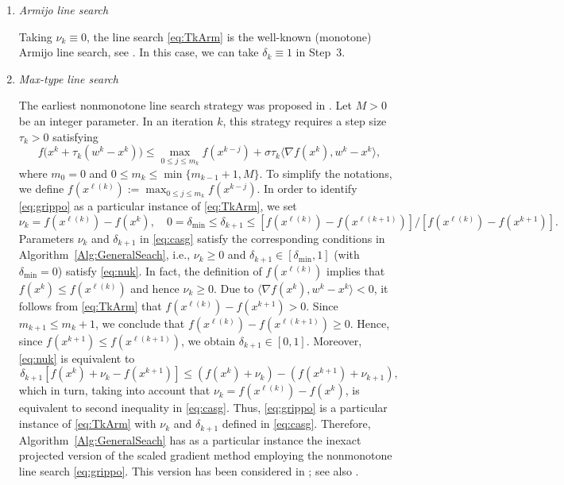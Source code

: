 \begin{enumerate}
	\item {\it Armijo line search}

	      Taking  $\nu_k\equiv 0$, the line search   \eqref{eq:TkArm}  is the well-known (monotone) Armijo line search, see \cite[Section 2.3]{Bertsekas1999}. In this case, we  can take  $\delta_k\equiv 1$ in Step~3.

	\item {\it Max-type line search}

	      The earliest nonmonotone line search strategy  was proposed  in \cite{Grippo1986}. Let $M>0$ be an integer parameter. In an iteration $k$, this strategy requires a step size $\tau_k>0$ satisfying
	      \begin{equation}\label{eq:grippo}
		      f\big(x^{k}+ \tau_k(w^k - x^{k})\big) \leq \max_{0\leq j\leq m_k}f(x^{k-j}) + \sigma \tau_k\big\langle \nabla f(x^{k}), w^k - x^{k} \big\rangle,
	      \end{equation}
	      where $m_0=0$ and $0\leq m_k\leq \min\{m_{k-1}+1, M\}$.  To simplify the notations,  we define $f(x^{\ell(k)}):=\max_{0\leq j\leq m_k}f(x^{k-j})$.  In order to identify \eqref{eq:grippo} as a particular instance of \eqref{eq:TkArm}, we  set
	      \begin{equation} \label{eq:casg}
		      \nu_{k}= f(x^{\ell(k)})-f(x^k), \quad 0=\delta_{\min}\leq \delta_{k+1}\leq  [f(x^{\ell(k)})- f(x^{\ell(k+1)})]/[f(x^{\ell(k)})-f(x^{k+1})].
	      \end{equation}
	      Parameters $\nu_{k}$ and $\delta_{k+1}$ in \eqref{eq:casg} satisfy the corresponding conditions in Algorithm~\ref{Alg:GeneralSeach}, i.e.,  $\nu_{k} \geq 0$ and  $\delta_{k+1}\in [\delta_{\min}, 1]$ (with   $\delta_{\min}=0$)  satisfy \eqref{eq:nuk}.  In fact, the definition of $f(x^{\ell(k)})$ implies that   $ f(x^{k})\leq f(x^{\ell(k)})$ and hence $\nu_{k} \geq 0$.  Due to  $\langle \nabla f(x^{k}), w^k - x^{k} \rangle<0$,   it follows from  \eqref{eq:TkArm} that $f(x^{\ell(k)})-f(x^{k+1})>0$. Since   $m_{k+1}\leq m_{k}+1$, we conclude that  $f(x^{\ell(k)})-f(x^{\ell(k+1)}) \geq 0$.  Hence, since $ f(x^{k+1})\leq f(x^{\ell(k+1)})$, we obtain $\delta_{k+1}\in [0, 1]$.  Moreover,  \eqref{eq:nuk} is equivalent  to  
	      $$
	        \delta_{k+1}[f(x^{k})+\nu_{k}-f(x^{k+1})] \leq(f(x^{k})+\nu_{k}) -  (f(x^{k+1})+ \nu_{k+1}),
	      $$  
	      which in turn, taking into account  that $\nu_{k}= f(x^{\ell(k)})-f(x^k)$, is equivalent to second inequality in \eqref{eq:casg}. Thus, \eqref{eq:grippo} is a particular instance of \eqref{eq:TkArm} with  $\nu_{k}$ and $\delta_{k+1}$ defined in \eqref{eq:casg}.  Therefore,  Algorithm~\ref{Alg:GeneralSeach} has as a particular instance the  inexact   projected  version of the scaled gradient method employing   the nonmonotone line search  \eqref{eq:grippo}. This version has been considered in \cite{BirginMartinezRaydan2003}; see also  \cite{Bonettini2009, WangLiu2005}.



\end{enumerate}
